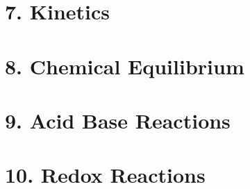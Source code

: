 \documentclass{cheatsheet}
\begin{document}
\section{7. Kinetics} %
	
	
	
	
	
	
	
	
	

\section{8. Chemical Equilibrium} %
	
	
	
	
	
\section{9. Acid Base Reactions} %
	
	
	
	
	

\section{10. Redox Reactions} %
	
	
	
\end{document}
